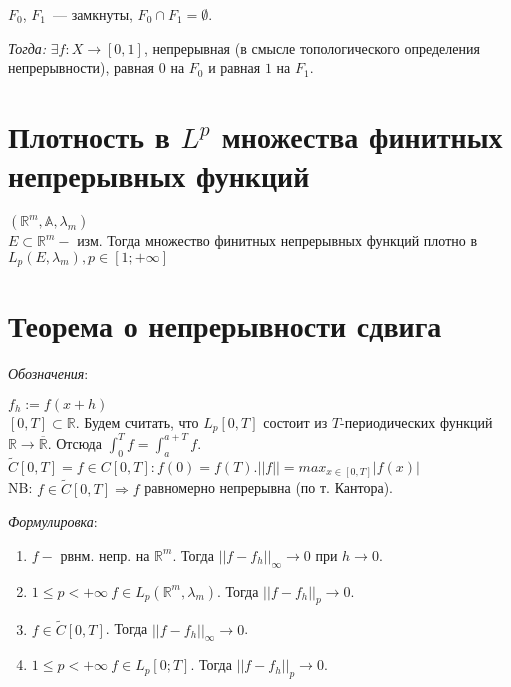     $F_0$, $F_1$~--- замкнуты, $F_0 \cap F_1 = \emptyset$.

    \emph{Тогда:} $\exists f: X \rightarrow [0,1]$, непрерывная (в смысле топологического определения непрерывности), равная $0$ на $F_0$ и равная $1$ на $F_1$.

    \section{Плотность в $L^p$ множества финитных непрерывных функций}
    $(\mathbb{R}^m, \mathbb{A}, \lambda_m)$\\

    $E \subset \mathbb{R}^m -$ изм. Тогда множество финитных непрерывных функций плотно в $L_p(E, \lambda_m), p \in [1; +\infty]$\\

    \section{Теорема о непрерывности сдвига}
    \emph{Обозначения}:

    $f_h := f(x+h)$ \\
    $[0, T] \subset \mathbb{R}$. Будем считать, что $L_p[0, T]$ состоит из $T$-периодических функций $\mathbb{R} \rightarrow \overline {\mathbb{R}}$. Отсюда $\int_{0}^{T} f = \int_{a}^{a+T} f.$ \\
    $\widetilde{C}[0, T] = {f \in C[0, T]: f(0) = f(T) }. ||f|| = max_{x\in[0,T]}|f(x)|$ \\
    NB: $f \in \widetilde{C}[0, T] \Rightarrow f$ равномерно непрерывна (по т. Кантора).

    \emph{Формулировка}:
    \begin{enumerate}
        \item $f - $ рвнм. непр. на $\mathbb{R}^m$. Тогда $||f-f_h||_\infty \rightarrow 0$ при $h\rightarrow 0$.
        \item $1 \leq p < + \infty \ f \in L_p(\mathbb{R}^m, \lambda_m)$. Тогда $||f-f_h||_p \rightarrow 0$.
        \item $f \in \widetilde{C}[0, T]$. Тогда $||f-f_h||_\infty \rightarrow 0$.
        \item $1 \leq p < + \infty \  f \in L_p[0; T]$. Тогда $||f-f_h||_p \rightarrow 0$.
    \end{enumerate}

